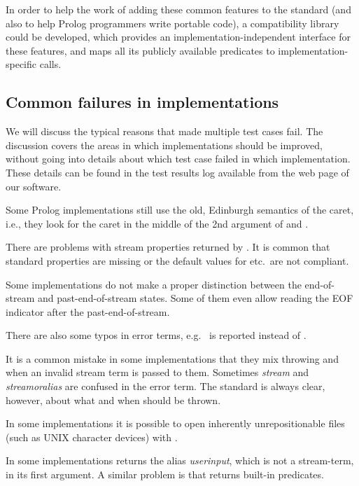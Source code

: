 \documentclass[draft]{llncs}%
\begin{document}
In order to help the work of adding these common features
to the standard (and also to help Prolog programmers write portable code), a
compatibility library could be developed, which provides an
implementation-independent interface for these features, and maps all its
publicly available predicates to implementation-specific calls.

\subsection{Common failures in implementations}

We will discuss the typical reasons that made multiple test cases fail. The
discussion covers the areas in which implementations should be
improved, without going into details
about which test case failed in which implementation. These details can be
found in the test results log available
from the web page of our software.

Some Prolog implementations still use the old, Edinburgh semantics of the
caret, i.e., they look for the caret in the middle of the 2nd argument of
 and .

There are problems with stream properties returned by
.
It is common that standard properties are
missing or the default values for  etc.\ are not
compliant.

Some implementations do not make a proper distinction between the
end-of-stream and past-end-of-stream states. Some of them even
allow reading the EOF indicator after the past-end-of-stream.

There are also some typos in error terms, e.g.\
 is reported instead of
\texttx{type\textunderscore error(atomic,...)}.

It is a common mistake in some implementations that they mix throwing
\hbox{\errorname{existence\textunderscore error}} and
 when an
invalid stream term is passed to them. Sometimes \textsl{stream} and
\textsl{stream\textunderscore or\textunderscore alias} are confused in the
error term.
The standard is always clear, however, about what and when should be thrown.

In some implementations it is possible to open 
inherently unrepositionable files
(such as UNIX character devices) with .

In some implementations  returns
the alias
\textsl{user\textunderscore input}, which is not a stream-term, in
its first argument. A similar problem is that
\hbox{} returns built-in predicates.
\end{document}
